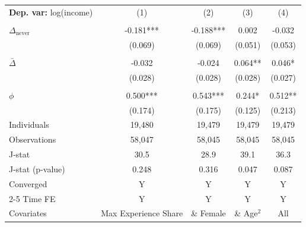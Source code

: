 \begin{tabular}{l cccc} \toprule  \textbf{Dep. var:}  log(income) 
                    &\multicolumn{1}{c}{(1)}   &\multicolumn{1}{c}{(2)}   &\multicolumn{1}{c}{(3)}   &\multicolumn{1}{c}{(4)}   \\
                    &               &               &               &               \\
\addlinespace
$\Delta_{\text{never}}$&      -0.181***&      -0.188***&       0.002   &      -0.032   \\
                    &     (0.069)   &     (0.069)   &     (0.051)   &     (0.053)   \\
                    &               &               &               &               \\
\addlinespace
$\bar{\Delta}$      &      -0.032   &      -0.024   &       0.064** &       0.046*  \\
                    &     (0.028)   &     (0.028)   &     (0.028)   &     (0.027)   \\
                    &               &               &               &               \\
\addlinespace
$\phi$              &       0.500***&       0.543***&       0.244*  &       0.512** \\
                    &     (0.174)   &     (0.175)   &     (0.125)   &     (0.213)   \\
\addlinespace
Individuals         &      19,480   &      19,479   &      19,479   &      19,479   \\
Observations        &      58,047   &      58,045   &      58,045   &      58,045   \\
J-stat              &        30.5   &        28.9   &        39.1   &        36.3   \\
J-stat (p-value)    &       0.248   &       0.316   &       0.047   &       0.087   \\
Converged           &           Y   &           Y   &           Y   &           Y   \\
\cmidrule{2-5} Time FE & Y & Y & Y & Y \\ Covariates & Max Experience Share & \& Female & \& Age$^2$ & All \\ \bottomrule \end{tabular}
